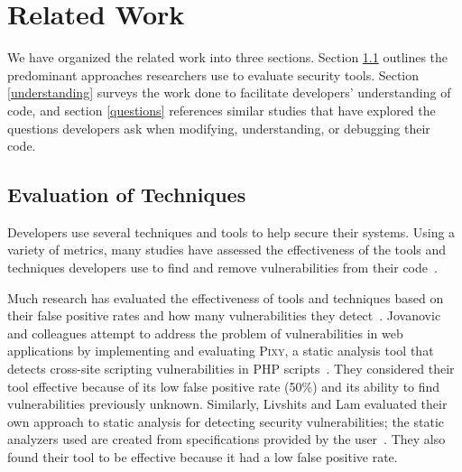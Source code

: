 \documentclass[conference]{IEEEtran}
\begin{document}
%



\section{Related Work}
\label{sec:rw}

We have organized the related work into three sections. Section \ref{evaluation} outlines the predominant approaches researchers use to evaluate security tools. Section \ref{understanding} surveys the work done to facilitate developers' understanding of code, and section \ref{questions} references similar studies that have explored the questions developers ask when modifying, understanding, or debugging their code.

\subsection{Evaluation of Techniques}
\label{evaluation}
Developers use several techniques and tools to help secure their systems.
Using a variety of metrics, many studies have assessed the effectiveness of the tools and techniques developers use to find and remove vulnerabilities from their code~\cite{martin2005finding, austin2011one, livshits2005finding}.  

Much research has evaluated the effectiveness of tools and techniques based on their false positive rates and how many vulnerabilities they detect~\cite{jovanovic2006pixy, austin2011one, dukes2013case}. 
Jovanovic and colleagues attempt to address the problem of vulnerabilities in web applications by implementing and evaluating \textsc{Pixy}, a static analysis tool that detects cross-site scripting vulnerabilities in PHP scripts~\cite{jovanovic2006pixy}. 
They considered their tool effective because of its low false positive rate (50\%) and its ability to find vulnerabilities previously unknown. 
Similarly, Livshits and Lam evaluated their own approach to static analysis for detecting security vulnerabilities; the static analyzers used are created from specifications provided by the user~\cite{livshits2005finding}. 
They also found their tool to be effective because it had a low false positive rate. 
\end{document}
